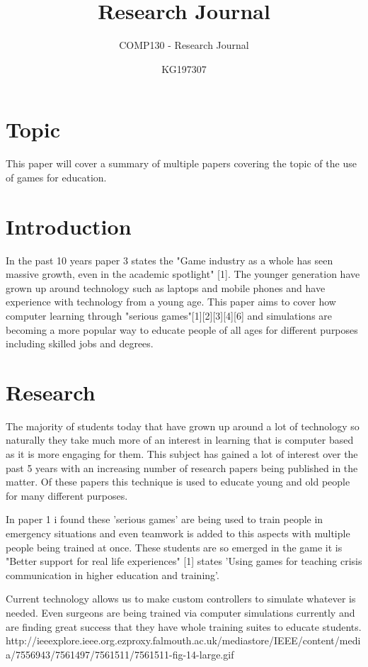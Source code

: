 \documentclass{scrartcl}
\title{Research Journal}
\subtitle{COMP130 - Research Journal}
\author{KG197307}
\begin{document}
\maketitle

\section*{Topic}

This paper will cover a summary of multiple papers covering the topic of the use of games for education.

\section*{Introduction}

In the past 10 years paper 3 states the "Game industry as a whole has seen massive growth, even in the academic spotlight" [1]\cite{}. The younger generation have grown up around technology such as laptops and mobile phones and have experience with technology from a young age. This paper aims to cover how computer learning through "serious games"[1][2][3][4][6] and simulations are becoming a more popular way to educate people of all ages for different purposes including skilled jobs and degrees. 

\section*{Research}

The majority of students today that have grown up around a lot of technology so naturally they take much more of an interest in learning that is computer based as it is more engaging for them. This subject has gained a lot of interest over the past 5 years with an increasing number of research papers being published in the matter. Of these papers this technique is used to educate young and old people for many different purposes. 

In paper 1 i found these 'serious games' are being used to train people in emergency situations and even teamwork is added to this aspects with multiple people being trained at once. These students are so emerged in the game it is "Better support for real life experiences" [1] states 'Using games for teaching crisis communication in higher education and training'. 

Current technology allows us to make custom controllers to simulate whatever is needed. Even surgeons are being trained via computer simulations currently and are finding great success that they have whole training suites to educate students. http://ieeexplore.ieee.org.ezproxy.falmouth.ac.uk/mediastore/IEEE/content/media/7556943/7561497/7561511/7561511-fig-14-large.gif
\end{document}
